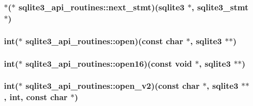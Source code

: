 \hypertarget{structsqlite3__api__routines_a5629a4f4840068678d7429f1e0939d97}{
\subsubsection[{next\-\_\-stmt}]{$\ast$($\ast$ sqlite3\-\_\-api\-\_\-routines\-::next\-\_\-stmt)({\bf sqlite3} $\ast$, {\bf sqlite3\-\_\-stmt} $\ast$)}}\label{structsqlite3__api__routines_a5629a4f4840068678d7429f1e0939d97}
\hypertarget{structsqlite3__api__routines_a1d0126d7384e1e4e0975d3084007af89}{
\subsubsection[{open}]{\setlength{\rightskip}{0pt plus 5cm}int($\ast$ sqlite3\-\_\-api\-\_\-routines\-::open)(const char $\ast$, {\bf sqlite3} $\ast$$\ast$)}}\label{structsqlite3__api__routines_a1d0126d7384e1e4e0975d3084007af89}
\hypertarget{structsqlite3__api__routines_a8394f1e962c0c3172ef7a0b6243303ca}{
\subsubsection[{open16}]{\setlength{\rightskip}{0pt plus 5cm}int($\ast$ sqlite3\-\_\-api\-\_\-routines\-::open16)(const void $\ast$, {\bf sqlite3} $\ast$$\ast$)}}\label{structsqlite3__api__routines_a8394f1e962c0c3172ef7a0b6243303ca}
\hypertarget{structsqlite3__api__routines_ac6da992cdbb490e1d1e856a4864851bf}{
\subsubsection[{open\-\_\-v2}]{\setlength{\rightskip}{0pt plus 5cm}int($\ast$ sqlite3\-\_\-api\-\_\-routines\-::open\-\_\-v2)(const char $\ast$, {\bf sqlite3} $\ast$$\ast$, int, const char $\ast$)}}\label{structsqlite3__api__routines_ac6da992cdbb490e1d1e856a4864851bf}
